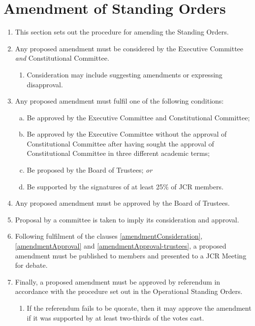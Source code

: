\documentclass[12pt]{article}
\begin{document}
\section{Amendment of Standing Orders}
\begin{enumerate}
    \item This section sets out the procedure for amending the Standing Orders.
    \item\label{amendmentConsideration} Any proposed amendment must be considered by the Executive Committee \emph{and} Constitutional Committee.
    \begin{enumerate}
        \item Consideration may include suggesting amendments or expressing disapproval.
    \end{enumerate}
    \item Any proposed amendment must fulfil one of the following conditions:\label{amendmentApproval}
    \begin{enumerate}[(a)]
        \item Be approved by the Executive Committee and Constitutional Committee;
        \item Be approved by the Executive Committee without the approval of Constitutional Committee after having sought the approval of Constitutional Committee in three different academic terms;
        \item Be proposed by the Board of Trustees; \emph{or}
        \item Be supported by the signatures of at least 25\% of JCR members.
    \end{enumerate}
    \item Any proposed amendment must be approved by the Board of Trustees.\label{amendmentApproval-trustees}
    \item Proposal by a committee is taken to imply its consideration and approval.
    \item\label{amendmentDebate}Following fulfilment of the clauses \ref{amendmentConsideration}, \ref{amendmentApproval} and \ref{amendmentApproval-trustees}, a proposed amendment must be published to members and presented to a JCR Meeting for debate.
    \item Finally, a proposed amendment must be approved by referendum in accordance with the procedure set out in the Operational Standing Orders.
    \begin{enumerate}
        \item If the referendum fails to be quorate, then it may approve the amendment if it was supported by at least two-thirds of the votes cast.

\end{enumerate}
\end{enumerate}
\end{document}
